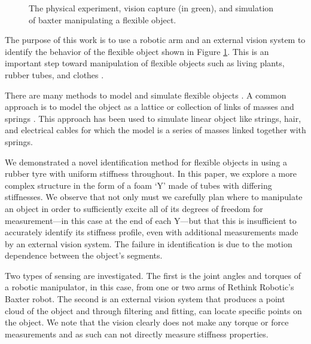\documentclass[runningheads,a4paper]{llncs}
\begin{document}
\begin{figure}[!htb]
\centering
\def\svgwidth{.95\textwidth}%

\caption{The physical experiment, vision capture (in green), and simulation of baxter manipulating a flexible object.} %
\label{fig-baxter_y}
\end{figure}

The purpose of this work is to use a robotic arm and an external vision system to identify the behavior of the flexible object shown in Figure \ref{fig-baxter_y}. This is an important step toward manipulation of flexible objects such as living plants, rubber tubes, and clothes \cite{wakamatsu2006knotting,saha2007manipulation,bell2010flexible,jimenez2012survey}.  

There are many methods to model and simulate flexible objects \cite{khalil_payeur,lang_etal}.  A common approach is to model the object as a lattice or collection of links of masses and springs \cite{sahari_etal,wakamatsu_etal,khalil_payeur}.  This approach has been used to simulate linear object like strings, hair, and electrical cables for which the model is a series of masses linked together with springs. %

We demonstrated a novel identification method for flexible objects in \cite{caldwell_coleman_correll_iros} using a rubber tyre with uniform stiffness throughout. In this paper, we explore a more complex structure in the form of a foam `Y' made of tubes with differing stiffnesses. We observe that not only must we carefully plan where to manipulate an object in order to sufficiently excite all of its degrees of freedom for measurement---in this case at the end of each Y---but that this is insufficient to accurately identify its stiffness profile, even with additional measurements made by an external vision system. The failure in identification is due to the motion dependence between the object's segments.

Two types of sensing are investigated. The first is the joint angles and torques of a robotic manipulator, in this case, from one or two arms of Rethink Robotic's Baxter robot. The second is an external vision system that produces a point cloud of the object and through filtering and fitting, can locate specific points on the object. We note that the vision clearly does not make any torque or force measurements and as such can not directly measure stiffness properties.
\end{document}
